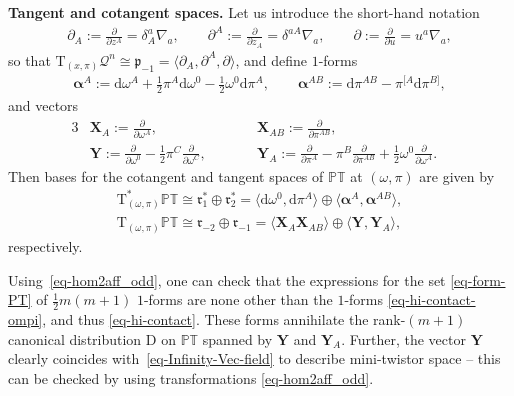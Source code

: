 \documentclass[10pt,a4paper]{amsart}
\numberwithin{equation}{section}
\newcommand{\parderv}[2] {\frac{\partial#1}{\partial#2}}
\newcommand{\mc} [1]{\mathcal{#1}}
\newcommand{\dd} {\mathrm{d}}
\newcommand{\Tgt} {\mathrm{T}}
\newcommand{\mfp} {\mathfrak{p}}
\newcommand{\mfr} {\mathfrak{r}}
\newcommand{\PT} {\mathbb{PT}}
\begin{document}
{\bf Tangent and cotangent spaces.} Let us introduce the short-hand notation
\begin{gather*}
\partial_{A} := \parderv{}{z^{A}} = \delta^a_A \nabla_a , \qquad \partial^{A} := \parderv{}{z_{A}} = \delta^{aA} \nabla_a , \qquad \partial := \parderv{}{u} = u^a \nabla_a ,
\end{gather*}
so that $\Tgt_{(x,\pi)} \mc{Q}^n \cong \mfp_{-1} = \langle \partial_{A} , \partial^{A} , \partial \rangle$, and def\/ine $1$-forms
\begin{gather}\label{eq-form-PT}
\bm{\alpha}^{A} := \dd \omega^{A} + \tfrac{1}{2} \pi^{A} \dd \omega^0 - \tfrac{1}{2} \omega^0 \dd \pi^{A} , \qquad \bm{\alpha}^{AB} := \dd \pi^{AB} - \pi^{[A} \dd \pi^{B]} ,
\end{gather}
and vectors
\begin{alignat}{3}
& \bm{X}_{A} := \parderv{}{\omega^{A}} , \qquad && \bm{X}_{AB} := \parderv{}{\pi^{AB}} ,& \nonumber\\
 & \bm{Y} := \parderv{}{\omega^0} - \frac{1}{2} \pi^{C} \parderv{}{\omega^C} , \qquad && \bm{Y}_{A} := \parderv{}{\pi^{A}} - \pi^{B} \parderv{}{\pi^{AB}} + \frac{1}{2} \omega^0 \parderv{}{\omega^A} .& \label{eq-vec-PT}
\end{alignat}
Then bases for the cotangent and tangent spaces of $\PT$ at $(\omega,\pi)$ are given by
\begin{gather*}
\Tgt^*_{(\omega,\pi)} \PT \cong \mfr^*_1 \oplus \mfr^*_2 = \big\langle \dd \omega^0, \dd \pi^A \big\rangle \oplus \big\langle \bm{\alpha}^{A} , \bm{\alpha}^{AB} \big\rangle , \\
 \Tgt_{(\omega,\pi)} \PT \cong \mfr_{-2} \oplus \mfr_{-1}
 = \big\langle \bm{X}_{A} \bm{X}_{AB} \big\rangle \oplus \big\langle \bm{Y} , \bm{Y}_{A} \big\rangle ,
\end{gather*}
respectively.

\begin{Remark}Using~\eqref{eq-hom2aff_odd}, one can check that the expressions for the set \eqref{eq-form-PT} of $\frac{1}{2}m(m+1)$ $1$-forms are none other than the $1$-forms \eqref{eq-hi-contact-ompi}, and thus \eqref{eq-hi-contact}. These forms annihilate the rank-$(m+1)$ canonical distribution $\mathrm{D}$ on $\PT$ spanned by $\bm{Y}$ and $\bm{Y}_{A}$. Further, the vector $\bm{Y}$ clearly coincides with~\eqref{eq-Infinity-Vec-field} to describe mini-twistor space -- this can be checked by using transformations \eqref{eq-hom2aff_odd}.
\end{Remark}
\end{document}
